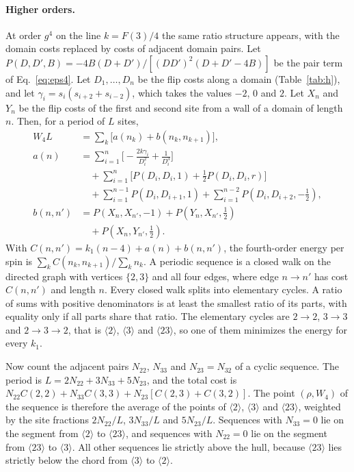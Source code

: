 \paragraph*{Higher orders.}
At order $g^4$ on the line $k=F(3)/4$ the same ratio structure appears, with the domain costs replaced by
costs of adjacent domain pairs. Let $P(D,D',B)=-4B(D+D')/[(DD')^2(D+D'-4B)]$ be the pair term of
Eq.~\eqref{eq:eps4}. Let $D_1,\dots,D_n$ be the flip costs along a domain (Table~\ref{tab:h}), and let
$\gamma_i=s_i(s_{i+2}+s_{i-2})$, which takes the values $-2$, $0$ and $2$. Let $X_n$ and $Y_n$ be the flip costs of
the first and second site from a wall of a domain of length $n$. Then, for a period of $L$ sites,
\begin{align}
W_4L&=\sum_k\big[a(n_k)+b(n_k,n_{k+1})\big],\nonumber\\
a(n)&=\sum_{i=1}^{n}\Big[-\frac{2k\gamma_i}{D_i^2}+\frac1{D_i^3}\Big]\nonumber\\
&\quad+\sum_{i=1}^{n}\Big[P(D_i,D_i,1)+\tfrac12P(D_i,D_i,r)\Big]\nonumber\\
&\quad+\sum_{i=1}^{n-1}P(D_i,D_{i+1},1)+\sum_{i=1}^{n-2}P(D_i,D_{i+2},-\tfrac12),\nonumber\\
b(n,n')&=P(X_n,X_{n'},-1)+P(Y_n,X_{n'},\tfrac12)\nonumber\\
&\quad+P(X_n,Y_{n'},\tfrac12).
\label{eq:ab}
\end{align}
With $C(n,n')=k_1(n-4)+a(n)+b(n,n')$, the fourth-order energy per spin is $\sum_kC(n_k,n_{k+1})/\sum_kn_k$.
A periodic sequence is a closed walk on the directed graph with vertices $\{2,3\}$ and all four edges, where
edge $n\to n'$ has cost $C(n,n')$ and length $n$. Every closed walk splits into elementary cycles. A ratio of
sums with positive denominators is at least the smallest ratio of its parts, with equality only if all parts
share that ratio. The elementary cycles are $2\to2$, $3\to3$ and $2\to3\to2$, that is $\langle2\rangle$,
$\langle3\rangle$ and $\langle23\rangle$, so one of them minimizes the energy for every $k_1$.

Now count the adjacent pairs $N_{22}$, $N_{33}$ and $N_{23}=N_{32}$ of a cyclic sequence. The period is
$L=2N_{22}+3N_{33}+5N_{23}$, and the total cost is $N_{22}C(2,2)+N_{33}C(3,3)+N_{23}[C(2,3)+C(3,2)]$. The point
$(\rho,W_4)$ of the sequence is therefore the average of the points of $\langle2\rangle$, $\langle3\rangle$ and
$\langle23\rangle$, weighted by the site fractions $2N_{22}/L$, $3N_{33}/L$ and $5N_{23}/L$. Sequences with
$N_{33}=0$ lie on the segment from $\langle2\rangle$ to $\langle23\rangle$, and sequences with $N_{22}=0$ lie on
the segment from $\langle23\rangle$ to $\langle3\rangle$. All other sequences lie strictly above the hull,
because $\langle23\rangle$ lies strictly below the chord from $\langle3\rangle$ to $\langle2\rangle$.

